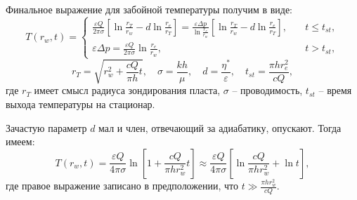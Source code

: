 	Финальное выражение для забойной температуры получим в виде:
\begin{equation}
	\label{temperature}
		T(r_w, t) = 
	\begin{cases}
		\displaystyle\frac{\varepsilon Q}{2\pi \sigma}\left[\ln\displaystyle\frac{r_T}{r_w}-d\ln\displaystyle\frac{r_e}{r_T}\right] = \displaystyle\frac{\varepsilon \Delta p}{\ln \displaystyle\frac{r_e}{r_w}}\left[\ln\displaystyle\frac{r_T}{r_w}-d\ln\displaystyle\frac{r_e}{r_T}\right], &\quad t\leq t_{st} ,\\
		\varepsilon \Delta p =  \displaystyle\frac{\varepsilon Q}{2\pi\sigma}\ln\frac{r_e}{r_w}, &\quad t>t_{st},
	\end{cases}
\end{equation}
\begin{equation}
	\label{terms33}
	r_T = \sqrt{r_w^2 + \frac{cQ}{\pi h}t}, \quad
	\sigma = \frac{kh}{\mu}, \quad d = \frac{\eta^{\ast}}{\varepsilon}, \quad
	t_{st} = \frac{\pi h r_e^2}{cQ},
\end{equation}
	где $r_T$ имеет смысл радиуса зондирования пласта,
	$\sigma$ -- проводимость,
	$t_{st}$ -- время выхода температуры на стационар.

	Зачастую параметр $d$ мал и член, отвечающий за адиабатику, опускают. Тогда имеем:
\begin{equation}
	\label{temperature1}
	T(r_w, t) = \frac{\varepsilon Q}{4 \pi \sigma}\ln\left[1+\frac{cQ}{\pi h r_w^2}t\right]	\approx
	\frac{\varepsilon Q}{4 \pi \sigma}\left[\ln\frac{cQ}{\pi h r_w^2}+\ln t\right],
\end{equation}
	где правое выражение записано в предположении, что $t \gg \displaystyle\frac{\pi h r_w^2}{cQ}$.